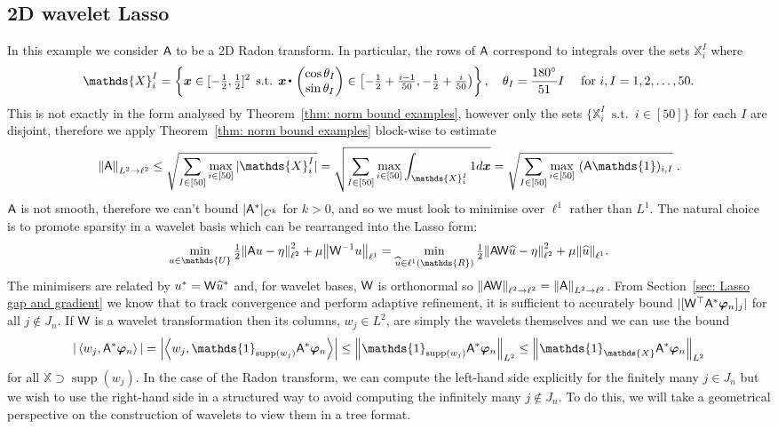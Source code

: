 \documentclass[smallextended]{svjour3}
\let\F\mathds\let\C\mathcal\newcommand{\R}{\F{R}}\newcommand{\A}{\tens{A}}
\newcommand{\norm}[1]{{\left\lVert #1 \right\rVert}}
\newcommand{\IP}[2]{\left\langle #1,#2 \right\rangle}
\newcommand{\ip}[2]{#1 \vcenter{\hbox{\resizebox{6pt}{!}{\ensuremath\cdot}}} #2}
\newcommand{\1}{\F{1}}
\DeclareMathOperator{\st}{\;s.t.\;}
\renewcommand{\hat}{\widehat}\renewcommand{\tilde}{\widetilde}
\DeclareMathOperator{\supp}{supp}
\newcommand*{\varf}[1]{%
	\IfEqCase{#1}{%
		{0}{u}%
		{1}{v}%
		{2}{w}%
	}[u#1]%
}
\newcommand*{\spcf}[1]{%
	\IfEqCase{#1}{%
		{0}{\F{U}}%
		{1}{\F{V}}%
		{2}{\F{W}}%
	}[\F{U}#1]%
}
\newcommand*{\vard}[1]{%
	\IfEqCase{#1}{%
		{0}{\varphi}%
		{1}{\psi}%
	}[\varphi #1]%
}
\newcommand*{\varx}[1]{%
	\IfEqCase{#1}{%
		{0}{x}%
		{1}{y}%
		{2}{z}%
		{3}{r}%
	}[x#1]%
}
\newcommand{\data}{\eta}
\newcommand*{\vvarx}[1]{\vec{\varx{#1}}}
\newcommand*{\vvard}[1]{\vec{\vard{#1}}}
\begin{document}
	\subsection{2D wavelet Lasso}\label{sec: wavelet examples}
	In this example we consider $\A$ to be a 2D Radon transform. In particular, the rows of $\A$ correspond to integrals over the sets $\F{X}^I_i$ where 
	\begin{equation}
		\F{X}_i^I = \left\{\vvarx0\in[-\tfrac12,\tfrac12]^2\st \ip{\vvarx0}{\begin{pmatrix}\cos\theta_I\\\sin\theta_I\end{pmatrix}}\in \left[-\tfrac12+\tfrac{i-1}{50},-\tfrac12+\tfrac{i}{50}\right)\right\}, \quad \theta_I=\frac{180^\circ}{51}I \quad \text{ for } i,I=1,2,\ldots,50.
	\end{equation}
	This is not exactly in the form analysed by Theorem~\ref{thm: norm bound examples}, however only the sets $\{\F{X}^I_i\st i\in[50]\}$ for each $I$ are disjoint, therefore we apply Theorem~\ref{thm: norm bound examples} block-wise to estimate
	\begin{equation}
		\norm{\A}_{L^2\to\ell^2} \leq \sqrt{\sum_{I\in[50]}\max_{i\in[50]} |\F{X}^I_i|} = \sqrt{\sum_{I\in[50]}\max_{i\in[50]} \int_{\F{X}^I_i}1d\vvarx0}= \sqrt{\sum_{I\in[50]}\max_{i\in[50]}\ (\A\1)_{i,I}}\;.
	\end{equation}
	$\A$ is not smooth, therefore we can't bound $|\A^*|_{C^k}$ for $k>0$, and so we must look to minimise over $\ell^1$ rather than $L^1$. The natural choice is to promote sparsity in a wavelet basis which can be rearranged into the Lasso form:
	\begin{equation}
		\min_{\varf0\in \spcf0} \tfrac12\norm{\A\varf0-\data}_{\ell^2}^2 + \mu \norm{\tens{W}^{-1}\varf0}_{\ell^1} = \min_{\hat{\varf0}\in\ell^1(\R)} \tfrac12\norm{\A\tens{W}\hat{\varf0}-\data}_{\ell^2}^2 + \mu \norm{\hat{\varf0}}_{\ell^1}.
	\end{equation}
	The minimisers are related by $\varf0^* = \tens{W}\hat{\varf0}^*$ and, for wavelet bases, $\mathsf{W}$ is orthonormal so $\norm{\A\tens{W}}_{\ell^2\to\ell^2} = \norm{\A}_{L^2\to\ell^2}$. From Section~\ref{sec: Lasso gap and gradient} we know that to track convergence and perform adaptive refinement, it is sufficient to accurately bound $|[\tens{W}^\top \A^*\vvard0_n]_j|$ for all $j\notin J_n$. If $\mathsf{W}$ is a wavelet transformation then its columns, $w_j\in L^2$, are simply the wavelets themselves and we can use the bound 
	\begin{equation}
		|\IP{w_j}{\A^*\vvard0_n}| = \left|\IP{w_j}{\1_{\supp(w_j)}\A^*\vvard0_n}\right| \leq \norm{\1_{\supp(w_j)} \A^*\vvard0_n}_{L^2}\leq \norm{\1_{\F{X}} \A^*\vvard0_n}_{L^2}
	\end{equation}
	for all $\F{X}\supset \supp(w_j)$.
	In the case of the Radon transform, we can compute the left-hand side explicitly for the finitely many $j\in J_n$ but we wish to use the right-hand side in a structured way to avoid computing the infinitely many $j\notin J_n$. To do this, we will take a geometrical perspective on the construction of wavelets to view them in a tree format. 
	
\end{document}

